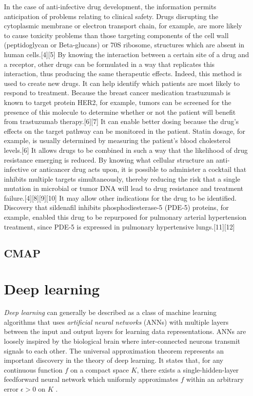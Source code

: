 \documentclass[bsc,frontabs,twoside,singlespacing,parskip,deptreport]{infthesis}     %
\begin{document}
In the case of anti-infective drug development, the information permits anticipation of problems relating to clinical safety. Drugs disrupting the cytoplasmic membrane or electron transport chain, for example, are more likely to cause toxicity problems than those targeting components of the cell wall (peptidoglycan or Beta-glucans) or 70S ribosome, structures which are absent in human cells.[4][5]
By knowing the interaction between a certain site of a drug and a receptor, other drugs can be formulated in a way that replicates this interaction, thus producing the same therapeutic effects. Indeed, this method is used to create new drugs.
It can help identify which patients are most likely to respond to treatment. Because the breast cancer medication trastuzumab is known to target protein HER2, for example, tumors can be screened for the presence of this molecule to determine whether or not the patient will benefit from trastuzumab therapy.[6][7]
It can enable better dosing because the drug's effects on the target pathway can be monitored in the patient. Statin dosage, for example, is usually determined by measuring the patient's blood cholesterol levels.[6]
It allows drugs to be combined in such a way that the likelihood of drug resistance emerging is reduced. By knowing what cellular structure an anti-infective or anticancer drug acts upon, it is possible to administer a cocktail that inhibits multiple targets simultaneously, thereby reducing the risk that a single mutation in microbial or tumor DNA will lead to drug resistance and treatment failure.[4][8][9][10]
It may allow other indications for the drug to be identified. Discovery that sildenafil inhibits phosphodiesterase-5 (PDE-5) proteins, for example, enabled this drug to be repurposed for pulmonary arterial hypertension treatment, since PDE-5 is expressed in pulmonary hypertensive lungs.[11][12]

\subsection{CMAP}
\section{Deep learning}
\textit{Deep learning} can generally be described as a class of machine learning algorithms that uses \textit{artificial neural networks} (ANNs) with multiple layers between the input and output layers for learning data representations. ANNs are loosely inspired by the biological brain where inter-connected neurons transmit signals to each other.
The universal approximation theorem represents an important discovery in the theory of deep learning. It states that, for any continuous function \(f\) on a compact space \(K\), there exists a single-hidden-layer feedforward neural network which uniformly approximates \(f\) within an arbitrary error \(\epsilon>0\) on \(K\) \cite{hornik_multilayer_1989}.
\end{document}
